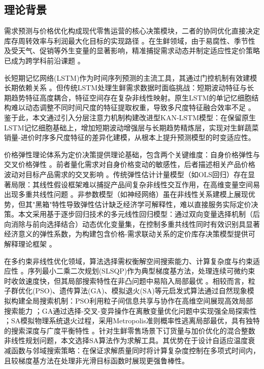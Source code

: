 \documentclass[lang=cn,12pt,a4paper]{elegantpaper}
\begin{document}
\subsection{理论背景}
\label{subsec:theoretical_background}

需求预测与价格优化构成现代零售运营的核心决策模块，二者的协同优化直接决定库存周转效率与利润最大化目标的实现路径 \citep{Mahapatra2025,Lu2024}。在生鲜领域，由于易腐性、季节性及受天气、促销等外生变量的显著影响，精准捕捉需求动态并制定适应性定价策略已成为跨学科前沿课题 \citep{Badakhshan2024,Hashemi-Amiri2023,Hofmann2018}。

长短期记忆网络(LSTM)作为时间序列预测的主流工具，其通过门控机制有效建模长期依赖关系 \citep{Hochreiter1997}。但传统LSTM处理生鲜需求数据时面临挑战：短期波动特征与长期趋势特征高度耦合，特征空间存在复杂非线性映射。原生LSTM的单记忆细胞结构难以动态调整不同时间尺度的特征提取权重，导致多尺度特征融合效率不足 \citep{Chien2021}。鉴于此，本文通过引入分层注意力机制构建改进型KAN-LSTM模型：在保留原生LSTM记忆细胞基础上，增加短期波动增强层与长期趋势精炼层，实现对生鲜蔬菜销量-进价时序多尺度特征的差异化建模，从根本上提升预测模型的时变适应性。

价格弹性理论体系为定价决策提供理论基础，包含两个关键维度：自身价格弹性与交叉价格弹性 \citep{Ellison2009}。前者量化需求对自身价格变动的敏感性，后者描述相关产品价格波动对目标产品需求的交叉影响 \citep{Mantrala2006,Chen2023}。传统弹性估计计量模型（如OLS回归）存在显著局限：其线性假设框架难以捕捉产品间复杂非线性交互作用，在高维变量空间易出现多重共线性问题 \citep{Rushchitsky2016,Bell2019}。非参数模型（如神经网络）虽在非线性关系建模上展现优势，但其"黑箱"特性导致弹性估计缺乏经济学可解释性，难以直接服务实际定价决策。本文采用基于逐步回归技术的多元线性回归模型：通过双向变量选择机制（后向消除与前向选择结合）动态优化变量集，在控制多重共线性同时有效识别具显著经济意义的弹性系数，为构建包含价格-需求联动关系的定价库存决策模型提供可解释理论框架 \citep{Kamakura1996,Walters1996}。

在多约束非线性优化领域，算法选择需权衡解空间搜索能力、计算复杂度与约束适应性 \citep{Belkourchia2019}。序列最小二乘二次规划(SLSQP)作为典型梯度基方法，处理连续可微约束时收敛速度快，但其局部搜索特性在非凸问题中易陷入局部最优 \citep{Gad2022a}。相较而言，粒子群优化(PSO)、遗传算法(GA)、模拟退火(SA)等元启发式算法通过自然现象模拟构建全局搜索机制：PSO利用粒子间信息共享与协作在高维空间展现高效局部搜索能力 \citep{Gad2022b}；GA通过选择-交叉-变异操作在离散变量优化问题中实现强全局探索性 \citep{Mangla2021}；SA模拟物理系统退火过程，采用Metropolis准则概率性逃离局部最优，具有独特的搜索深度与广度平衡特性 \citep{Yunzhu2023a}。针对生鲜零售场景下订货量与加价优化的混合整数非线性规划问题，本文选择SA算法作为求解工具。其优势在于设计自适应温度衰减函数与邻域搜索策略：在保证求解质量同时将计算复杂度控制在多项式时间内，且较梯度基方法在处理非光滑目标函数时展现更强鲁棒性。
\end{document}
